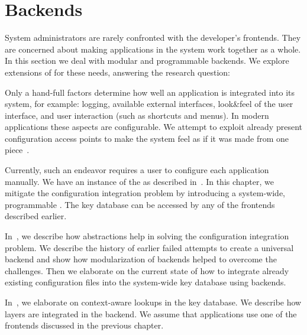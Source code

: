 \chapter{Backends}
\label{chapter:backend}

\chapterhung


System administrators are rarely confronted with the developer's frontends.
They are concerned about making applications in the system work together as a whole.
In this section we deal with modular and programmable backends.
We explore extensions of  for these needs, answering the research question:
\rqBackend*

Only a hand-full factors determine how well an application is integrated into its system, for example:
logging, available external interfaces, look\&feel of the user interface, and user interaction (such as shortcuts and menus).
In modern applications these aspects are configurable.
We attempt to exploit already present configuration access points to make the system feel as if it was made from one piece~\cite{raab2015kps}.

Currently, such an endeavor requires a user to configure each application manually.
We have an instance of the  as described in~.
In this chapter, we mitigate the configuration integration problem by introducing a system-wide, programmable .
The key database can be accessed by any of the frontends described earlier.

In~, we describe how abstractions help in solving the configuration integration problem.
We describe the history of earlier failed attempts to create a universal backend and show how modularization of backends helped to overcome the challenges.
Then we elaborate on the current state of how to integrate already existing configuration files into the system-wide key database using backends.

In~, we elaborate on context-aware lookups in the key database.
We describe how layers are integrated in the backend.
We assume that applications use one of the frontends discussed in the previous chapter.

